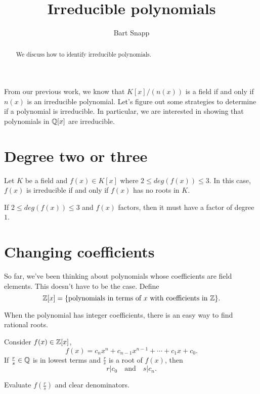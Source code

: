 \documentclass{ximera}
\author{Bart Snapp}
\title{Irreducible polynomials}
\begin{document}
\begin{abstract}
  We discuss how to identify irreducible polynomials.
\end{abstract}
\maketitle

From our previous work, we know that $K[x]/(n(x))$ is a field if and
only if $n(x)$ is an irreducible polynomial. Let's figure out some
strategies to determine if a polynomial is irreducible. In particular,
we are interested in showing that polynomials in $\mathbb Q[x]$ are
irreducible.

\section{Degree two or three}

\begin{lemma}\label{L:d23}
  Let $K$ be a field and $f(x)\in K[x]$ where $2 \le deg(f(x))\le 3$. In
  this case, $f(x)$ is irreducible if and only if $f(x)$ has no roots
  in $K$.
  \begin{sketch}
    If $2 \le deg(f(x))\le 3$ and $f(x)$ factors, then it must have a
    factor of degree $1$.
  \end{sketch}
\end{lemma}






\section{Changing coefficients}

So far, we've been thinking about polynomials whose coefficients are
field elements. This doesn't have to be the case. Define
\[
\mathbb Z[x] = \{\text{polynomials in terms of $x$ with coefficients in
  $\mathbb Z$}\}.
\]

When the polynomial has integer coefficients, there is an easy way to
find rational roots.

\begin{lemma}\label{L:rr}
  Consider $f(x) \in \mathbb Z[x]$,
  \[
  f(x) = c_nx^n + c_{n-1}x^{n-1} + \cdots + c_1 x + c_0.
  \]
  If $\frac{r}{s}\in\mathbb Q$ is in lowest terms and $\frac{r}{s}$ is a root
  of $f(x)$, then
  \[
  r | c_0 \quad\text{and}\quad s | c_n.
  \]
  \begin{sketch}
    Evaluate $f\left(\frac{r}{s}\right)$ and clear denominators.
  \end{sketch}
\end{lemma}
\end{document}
